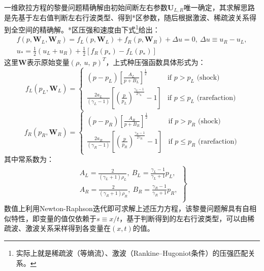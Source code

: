 \documentclass[11pt]{article}
\begin{document}
一维欧拉方程的黎曼问题精确解由初始间断左右参数$\bm{U}_{L,R}$唯一确定，其求解思路是先基于左右值判断左右行波类型、得到*区参数，随后根据激波、稀疏波关系得到全空间的精确解。*区压强和速度由下式\footnote{实际上就是稀疏波（等熵流）、激波（Rankine–Hugoniot条件）的压强匹配关系。}给出：
\begin{eqnarray}
	f(p,\bm{W}_L,\bm{W}_R)=f_L(p,\bm{W}_L)+f_R(p,\bm{W}_R)+\Delta u=0,\ \Delta u\equiv u_R-u_L, \\
	u_*=\frac{1}{2}(u_L+u_R)+\frac{1}{2}\left[f_R(p_*)-f_L(p_*)\right]
\end{eqnarray}
这里$\bm{W}$表示原始变量$(\rho,\ u,\ p)^T$，上式种压强函数具体形式为：
\begin{equation}
	f_L(p_L,\bm{W}_L)=\left\{\begin{array}{ll}
		(p-p_L)\left[\frac{A_L}{p+B_L}\right]^{\frac{1}{2}}                                               & \text{if }p>p_L\text{ (shock)}           \\
		\frac{2a_L}{(\gamma_L-1)}\left[\left(\frac{p}{p_L}\right)^{\frac{\gamma_L-1}{2\gamma_L}}-1\right] & \text{if }p\leq p_L\text{ (rarefaction)}
	\end{array}\right.
\end{equation}
\begin{equation}
	f_R(p_R,\bm{W}_R)=\left\{\begin{array}{ll}
		(p-p_R)\left[\frac{A_R}{p+B_R}\right]^{\frac{1}{2}}                                               & \text{if }p>p_R\text{ (shock)}           \\
		\frac{2a_R}{(\gamma_R-1)}\left[\left(\frac{p}{p_R}\right)^{\frac{\gamma_R-1}{2\gamma_R}}-1\right] & \text{if }p\leq p_R\text{ (rarefaction)}
	\end{array}\right.
\end{equation}
其中常系数为：
\begin{eqnarray}
	\left.\begin{array}{l}
		A_L=\frac{2}{(\gamma_L+1)\rho_L},\ B_L=\frac{\gamma_L-1}{\gamma_L+1}p_L, \\
		A_R=\frac{2}{(\gamma_R+1)\rho_R},\ B_R=\frac{\gamma_R-1}{\gamma_R+1}p_R, \\
	\end{array}\right\}
\end{eqnarray}
数值上利用Newton-Raphson迭代即可求解上述压力方程，该黎曼问题解具有自相似特性，即变量的值仅依赖于$s\equiv x/t$，基于判断得到的左右行波类型，可以由稀疏波、激波关系采样得到各变量在$(x,t)$的值。
\end{document}
